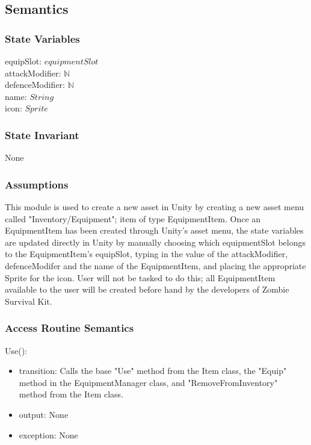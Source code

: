 \documentclass[12pt]{article}
\begin{document}
\subsection* {Semantics}

\subsubsection* {State Variables}

equipSlot: $equipmentSlot$\\
attackModifier: $\mathbb{N}$\\
defenceModifier: $\mathbb{N}$\\
name: $String$\\
icon: $Sprite$

\subsubsection* {State Invariant}

None

\subsubsection* {Assumptions}

This module is used to create a new asset in Unity by creating a new asset menu called "Inventory/Equipment"; item of type EquipmentItem. Once an EquipmentItem has been created through Unity's asset menu, the state variables are updated directly in Unity by manually choosing which equipmentSlot belongs to the EquipmentItem's equipSlot, typing in the value of the attackModifier, defenceModifer and the name of the EquipmentItem, and placing the appropriate Sprite for the icon. User will not be tasked to do this; all EquipmentItem available to the user will be created before hand by the developers of Zombie Survival Kit.

\subsubsection* {Access Routine Semantics}

\noindent Use():
\begin{itemize}
\item transition: Calls the base "Use" method from the Item class, the "Equip" method in the EquipmentManager class, and "RemoveFromInventory" method from the Item class.
\item output: None
\item exception: None
\end{itemize}
\end{document}
